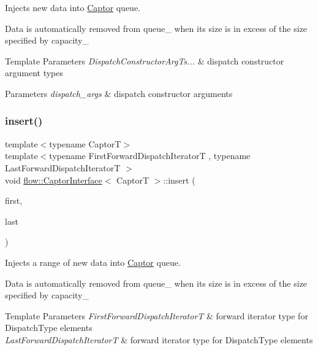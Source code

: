 Injects new data into \hyperlink{classflow_1_1_captor}{Captor} queue. 

Data is automatically removed from {\ttfamily queue\+\_\+} when its size is in excess of the size specified by {\ttfamily capacity\+\_\+}


\begin{DoxyTemplParams}{Template Parameters}
{\em Dispatch\+Constructor\+Arg\+Ts...} & dispatch constructor argument types\\
\hline
\end{DoxyTemplParams}

\begin{DoxyParams}{Parameters}
{\em dispatch\+\_\+args} & dispatch constructor arguments \\
\hline
\end{DoxyParams}
\mbox{\label{classflow_1_1_captor_interface_a545a4d188f6069261854c9753893fa98}} 
\subsubsection{\texorpdfstring{insert()}{insert()}}
{\footnotesize\ttfamily template$<$typename CaptorT$>$ \\
template$<$typename First\+Forward\+Dispatch\+IteratorT , typename Last\+Forward\+Dispatch\+IteratorT $>$ \\
void \hyperlink{classflow_1_1_captor_interface}{flow\+::\+Captor\+Interface}$<$ CaptorT $>$\+::insert (\begin{DoxyParamCaption}\item[{First\+Forward\+Dispatch\+IteratorT \&\&}]{first,  }\item[{Last\+Forward\+Dispatch\+IteratorT \&\&}]{last }\end{DoxyParamCaption})\hspace{0.3cm}{\ttfamily [inline]}}



Injects a range of new data into \hyperlink{classflow_1_1_captor}{Captor} queue. 

Data is automatically removed from {\ttfamily queue\+\_\+} when its size is in excess of the size specified by {\ttfamily capacity\+\_\+}


\begin{DoxyTemplParams}{Template Parameters}
{\em First\+Forward\+Dispatch\+IteratorT} & forward iterator type for {\ttfamily Dispatch\+Type} elements \\
\hline
{\em Last\+Forward\+Dispatch\+IteratorT} & forward iterator type for {\ttfamily Dispatch\+Type} elements\\
\hline
\end{DoxyTemplParams}

